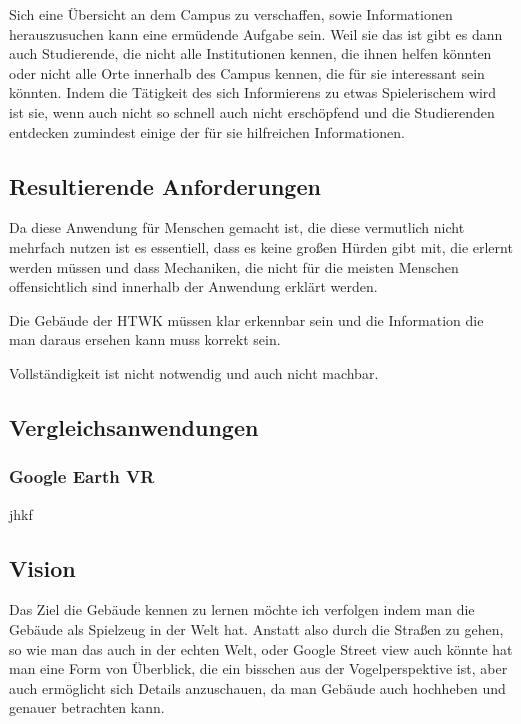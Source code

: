 \documentclass[11pt]{article} %
\begin{document}
 Sich eine Übersicht an dem Campus zu verschaffen, sowie Informationen herauszusuchen kann eine ermüdende Aufgabe sein. Weil sie das ist gibt es dann auch Studierende, die nicht alle Institutionen kennen, die ihnen helfen könnten oder nicht alle Orte innerhalb des Campus kennen, die für sie interessant sein könnten. Indem die Tätigkeit des sich Informierens zu etwas Spielerischem wird ist sie, wenn auch nicht so schnell auch nicht erschöpfend und die Studierenden entdecken zumindest einige der für sie hilfreichen Informationen.


\subsection{Resultierende Anforderungen}

Da diese Anwendung für Menschen gemacht ist, die diese vermutlich nicht mehrfach nutzen ist es essentiell, dass es keine großen Hürden gibt mit, die erlernt werden müssen und dass Mechaniken, die nicht für die meisten Menschen offensichtlich sind innerhalb der Anwendung erklärt werden.

Die Gebäude der HTWK müssen klar erkennbar sein und die Information die man daraus ersehen kann muss korrekt sein.

Vollständigkeit ist nicht notwendig und auch nicht machbar.

\subsection{Vergleichsanwendungen}

\subsubsection{Google Earth VR}
jhkf

\subsection{Vision}

Das Ziel die Gebäude kennen zu lernen möchte ich verfolgen indem man die Gebäude als Spielzeug in der Welt hat. Anstatt also durch die Straßen zu gehen, so wie man das auch in der echten Welt, oder Google Street view auch könnte hat man eine Form von Überblick, die ein bisschen aus der Vogelperspektive ist, aber auch ermöglicht sich Details anzuschauen, da man Gebäude auch hochheben und genauer betrachten kann.
\end{document}
